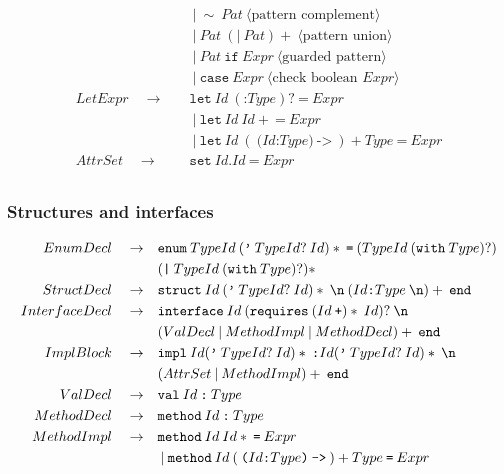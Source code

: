\documentclass[a4paper, 12pt]{article}
\newcommand{\sepbar}{\: | \:}	%
\newcommand{\substo}{\quad\rightarrow\quad}
\renewcommand{\tt}{\texttt}
\newcommand{\la}{\langle}
\newcommand{\ra}{\rangle}
\begin{document}
\begin{align*}
& \sepbar \sim\:Pat \:\la\text{pattern complement}\ra\\
& \sepbar Pat\: (\tt{|}\: Pat)+\:\la\text{pattern union}\ra\\
& \sepbar Pat\:\tt{if}\: Expr\:\la\text{guarded pattern}\ra\\
& \sepbar \tt{case}\: Expr\:\la\text{check boolean }Expr\ra\\
LetExpr \substo& \tt{let}\: Id \:(\tt{:} Type)? \: \tt{=} \: Expr\\
&\sepbar \tt{let}\: Id \: Id+ \: \tt{=} \: Expr\\
&\sepbar \tt{let}\: Id \: (\: \tt{(} Id\tt{:} Type \tt{)}\: \tt{->} \:)+ Type \: \tt{=}\: Expr\\
AttrSet \substo& \tt{set}\: Id\tt{.}Id\: \tt{=} \:Expr\\
\end{align*}
\subsubsection{Structures and interfaces}
\begin{align*}
EnumDecl \substo& \tt{enum}\: TypeId \: (\tt{'}\: TypeId?\: Id)* \: \texttt{=} \: (TypeId \: (\texttt{with}\: Type)?)\\
&(\texttt{|}\:TypeId \: (\texttt{with}\: Type)?)*\\
StructDecl \substo& \tt{struct}\: Id \: (\tt{'}\: TypeId?\: Id)*\: \tt{\symbol{92}n} \: (Id\tt{:} Type\: \tt{\symbol{92}n})+\: \tt{end}\\
InterfaceDecl \substo& \tt{interface}\: Id\: ( \tt{requires} \: (Id \: \tt{+})*\: Id)? \:  \tt{\symbol{92}n}\\
&(ValDecl \sepbar MethodImpl \sepbar MethodDecl)+\: \tt{end}\\
ImplBlock \substo& \tt{impl}\: Id (\tt{'}\: TypeId?\: Id)* \: \tt{:} Id (\tt{'}\: TypeId?\: Id)* \: \tt{\symbol{92}n}\\
&(AttrSet \sepbar MethodImpl)+\: \tt{end} \\
ValDecl \substo& \tt{val} \: Id\: \tt{:}\: Type \\
MethodDecl \substo& \tt{method} \: Id\: \tt{:} \: Type\\\
MethodImpl \substo& \tt{method} \: Id\: Id*\: \tt{=}\: Expr\\
&\sepbar \tt{method}\: Id \: (\: \tt{(} Id\tt{:} Type \tt{)}\: \tt{->} \:)+ Type \: \tt{=}\: Expr\\
\end{align*}
\end{document}
